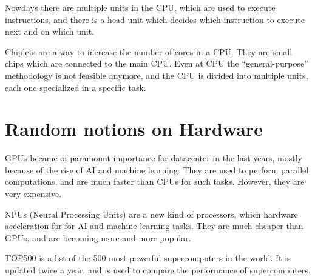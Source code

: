 Nowdays there are multiple units in the CPU, which are used to execute instructions, and there is a head unit which decides which instruction to execute next and on which unit.

Chiplets are a way to increase the number of cores in a CPU. They are small chips which are connected to the main CPU.
Even at CPU the ``general-purpose'' methodology is not feasible anymore, and the CPU is divided into multiple units, each one specialized in a specific task.

\section{Random notions on Hardware}
GPUs became of paramount importance for datacenter in the last years, mostly because of the rise of AI and machine learning. They are used to perform parallel computations, and are much faster than CPUs for such tasks.
However, they are very expensive.

NPUs (Neural Processing Units) are a new kind of processors, which hardware acceleration for for AI and machine learning tasks.
They are much cheaper than GPUs, and are becoming more and more popular.

\href{https://www.top500.org/}{TOP500} is a list of the 500 most powerful supercomputers in the world. It is updated twice a year, and is used to compare the performance of supercomputers.

